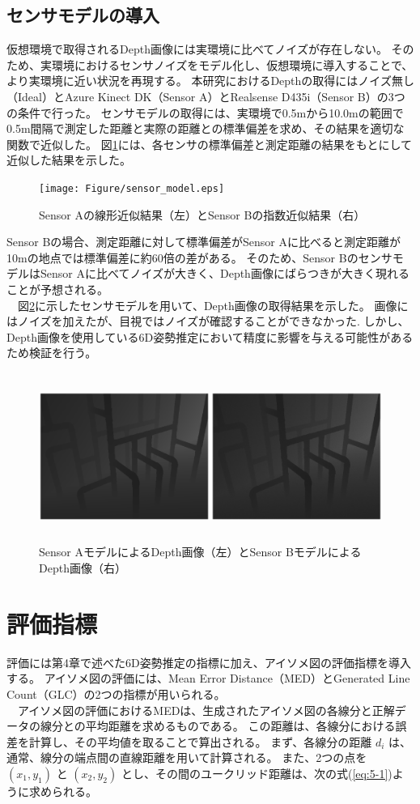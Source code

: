 \subsection{センサモデルの導入}
仮想環境で取得されるDepth画像には実環境に比べてノイズが存在しない。
そのため、実環境におけるセンサノイズをモデル化し、仮想環境に導入することで、より実環境に近い状況を再現する。
本研究におけるDepthの取得にはノイズ無し（Ideal）とAzure Kinect DK（Sensor A）とRealsense D435i（Sensor B）の3つの条件で行った。
センサモデルの取得には、実環境で0.5mから10.0mの範囲で0.5m間隔で測定した距離と実際の距離との標準偏差を求め、その結果を適切な関数で近似した。
図\ref{fig:5-f2}には、各センサの標準偏差と測定距離の結果をもとにして近似した結果を示した。
\begin{figure}[htbt]
    \centering
    \texttt{[image: Figure/sensor\_model.eps]}
    \caption{Sensor Aの線形近似結果（左）とSensor Bの指数近似結果（右）}
    \label{fig:5-f2}
\end{figure}

Sensor Bの場合、測定距離に対して標準偏差がSensor Aに比べると測定距離が10mの地点では標準偏差に約60倍の差がある。
そのため、Sensor BのセンサモデルはSensor Aに比べてノイズが大きく、Depth画像にばらつきが大きく現れることが予想される。\\
　図\ref{fig:5-f3}に示したセンサモデルを用いて、Depth画像の取得結果を示した。
画像にはノイズを加えたが、目視ではノイズが確認することができなかった.
しかし、Depth画像を使用している6D姿勢推定において精度に影響を与える可能性があるため検証を行う。
\begin{figure}[htbt]
    \centering
    \includegraphics[height=55mm]{Figure/depth_sim.eps}
    \caption{Sensor AモデルによるDepth画像（左）とSensor BモデルによるDepth画像（右）}
    \label{fig:5-f3}
\end{figure}

\section{評価指標}
評価には第4章で述べた6D姿勢推定の指標に加え、アイソメ図の評価指標を導入する。
アイソメ図の評価には、Mean Error Distance（MED）とGenerated Line Count（GLC）の2つの指標が用いられる。\\
　アイソメ図の評価におけるMEDは、生成されたアイソメ図の各線分と正解データの線分との平均距離を求めるものである。
この距離は、各線分における誤差を計算し、その平均値を取ることで算出される。
まず、各線分の距離 $d_i$ は、通常、線分の端点間の直線距離を用いて計算される。
また、2つの点を $(x_1, y_1)$ と $(x_2, y_2)$ とし、その間のユークリッド距離は、次の式(\ref{eq:5-1})ように求められる。

